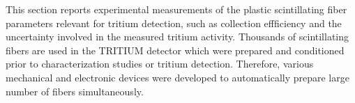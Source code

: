 This section reports experimental measurements of the plastic scintillating fiber parameters relevant for tritium detection, such as collection effficiency and the uncertainty involved in the measured tritium activity. Thousands of scintillating fibers are used in the TRITIUM detector which were prepared and conditioned prior to characterization studies or tritium detection. Therefore, various mechanical and electronic devices were developed to automatically prepare large number of fibers simultaneously.